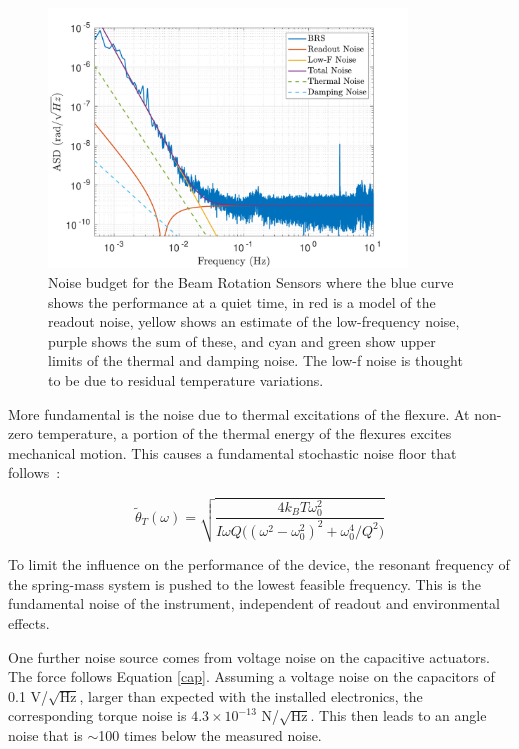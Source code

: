 \documentclass [12pt, proquest]{uwthesis}[2019]
\begin{document}
\begin{figure}
\begin{center}
\includegraphics[width=0.85\textwidth]{BRSNoiseModel.pdf}
\caption[Noise budge for the Beam Rotation Sensors]{Noise budget for the Beam Rotation Sensors where the blue curve shows the performance at a quiet time, in red is a model of the readout noise, yellow shows an estimate of the low-frequency noise, purple shows the sum of these, and cyan and green show upper limits of the thermal and damping noise. The low-f noise is thought to be due to residual temperature variations.}
\label{noise}
\end{center}
\end{figure}

More fundamental is the noise due to thermal excitations of the flexure. At non-zero temperature, a portion of the thermal energy of the flexures excites mechanical motion. This causes a fundamental stochastic noise floor that follows~\cite{thermal}:

\begin{equation}
\tilde\theta_T(\omega)=\sqrt{\frac{4 k_B T \omega_0^2}{I \omega Q\big((\omega^2-\omega_0^2)^2+\omega_0^4/Q^2\big)}}
\end{equation}

To limit the influence on the performance of the device, the resonant frequency of the spring-mass system is pushed to the lowest feasible frequency. This is the fundamental noise of the instrument, independent of readout and environmental effects.

 One further noise source comes from voltage noise on the capacitive actuators. The force follows Equation \ref{cap}. Assuming a voltage noise on the capacitors of 0.1 V/$\sqrt{\text{Hz}}$, larger than expected with the installed electronics, the corresponding torque noise is $4.3 \times 10^{-13}$ N/$\sqrt{\text{Hz}}$. This then leads to an angle noise that is $\sim$100 times below the measured noise.
\end{document}
